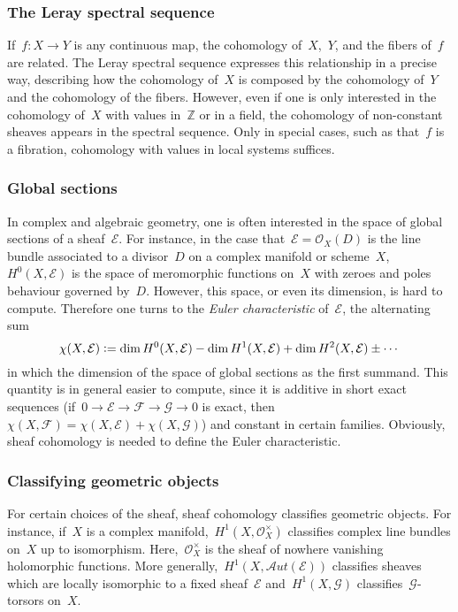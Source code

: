 \documentclass[10pt]{amsart}
\theoremstyle{definition}
\theoremstyle{plain}
\theoremstyle{remark}
\newcommand{\E}{\mathcal{E}}
\newcommand{\F}{\mathcal{F}}
\newcommand{\G}{\mathcal{G}}
\renewcommand{\O}{\mathcal{O}}
\newcommand{\ZZ}{\mathbb{Z}}
\newcommand{\defeq}{\vcentcolon=}
\begin{document}
\subsubsection*{The Leray spectral sequence} If~$f : X \to Y$ is any continuous map,
the cohomology of~$X$,~$Y$, and the fibers of~$f$ are related. The
Leray spectral sequence expresses this relationship in a precise way,
describing how the cohomology of~$X$ is composed by the cohomology of~$Y$ and
the cohomology of the fibers. However, even if one is only interested in the
cohomology of~$X$ with values in~$\ZZ$ or in a field, the cohomology of
non-constant sheaves appears in the spectral sequence. Only in special cases,
such as that~$f$ is a fibration, cohomology with values in local systems suffices.

\subsubsection*{Global sections} In complex and algebraic geometry, one is often
interested in the space of global sections of a sheaf~$\E$. For instance, in
the case that~$\E = \O_X(D)$ is the line bundle associated to a divisor~$D$ on a
complex manifold or scheme~$X$, $H^0(X,\E)$ is the space of meromorphic
functions on~$X$ with zeroes and poles behaviour governed by~$D$. However, this
space, or even its dimension, is hard to compute. Therefore one turns to the
\emph{Euler characteristic} of~$\E$, the alternating sum
\[ \chi(X,\E) \defeq \dim H^0(X,\E) - \dim H^1(X,\E) + \dim H^2(X,\E) \pm
\cdots \]
in which the dimension of the space of global sections as the first summand. This
quantity is in general easier to compute, since it is additive in short exact
sequences (if~$0 \to \E \to \F \to \G \to 0$ is exact, then~$\chi(X,\F) =
\chi(X,\E) + \chi(X,\G)$) and constant in certain families. Obviously,
sheaf cohomology is needed to define the Euler characteristic.

\subsubsection*{Classifying geometric objects} For certain choices of the sheaf, sheaf
cohomology classifies geometric objects. For instance, if~$X$ is a complex
manifold,~$H^1(X,\O_X^\times)$ classifies complex line bundles on~$X$ up to
isomorphism. Here,~$\O_X^\times$ is the sheaf of nowhere vanishing holomorphic
functions. More generally,~$H^1(X,\mathcal{A}ut(\E))$ classifies sheaves which
are locally isomorphic to a fixed sheaf~$\E$ and~$H^1(X,\G)$
classifies~$\G$-torsors on~$X$.
\end{document}
